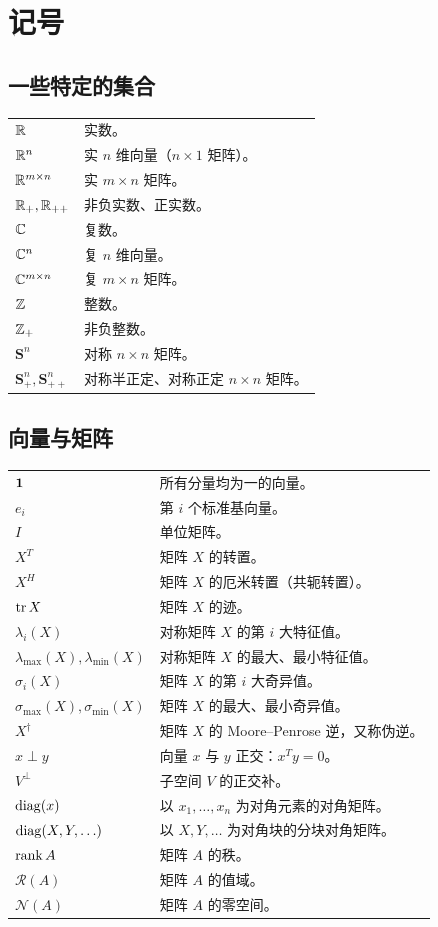 \chapter*{记号}
\section*{一些特定的集合}
\begin{longtable}{@{}p{}p{}@{}}
$\mathbb R$ & 实数。\\
$\mathbb R^n$ & 实 $n$ 维向量（$n\times1$ 矩阵）。\\
$\mathbb R^{m\times n}$ & 实 $m\times n$ 矩阵。\\
$\mathbb R_+,\mathbb R_{++}$ & 非负实数、正实数。\\
$\mathbb C$ & 复数。\\
$\mathbb C^n$ & 复 $n$ 维向量。\\
$\mathbb C^{m\times n}$ & 复 $m\times n$ 矩阵。\\
$\mathbb Z$ & 整数。\\
$\mathbb Z_+$ & 非负整数。\\
$\mathbf S^n$ & 对称 $n\times n$ 矩阵。\\
$\mathbf S_+^n,\mathbf S_{++}^n$ & 对称半正定、对称正定 $n\times n$ 矩阵。
\end{longtable}

\section*{向量与矩阵}
\begin{longtable}{@{}p{}p{}@{}}
$\mathbf 1$ & 所有分量均为一的向量。\\
$e_i$ & 第 $i$ 个标准基向量。\\
$I$ & 单位矩阵。\\
$X^T$ & 矩阵 $X$ 的转置。\\
$X^H$ & 矩阵 $X$ 的厄米转置（共轭转置）。\\
$\operatorname{tr} X$ & 矩阵 $X$ 的迹。\\
$\lambda_i(X)$ & 对称矩阵 $X$ 的第 $i$ 大特征值。\\
$\lambda_{\max}(X),\lambda_{\min}(X)$ & 对称矩阵 $X$ 的最大、最小特征值。\\
$\sigma_i(X)$ & 矩阵 $X$ 的第 $i$ 大奇异值。\\
$\sigma_{\max}(X),\sigma_{\min}(X)$ & 矩阵 $X$ 的最大、最小奇异值。\\
$X^\dagger$ & 矩阵 $X$ 的 Moore--Penrose 逆，又称伪逆。\\
$x\perp y$ & 向量 $x$ 与 $y$ 正交：$x^Ty=0$。\\
$V^\perp$ & 子空间 $V$ 的正交补。\\
$\operatorname{diag}(x)$ & 以 $x_1,\ldots,x_n$ 为对角元素的对角矩阵。\\
$\operatorname{diag}(X,Y,\ldots)$ & 以 $X,Y,\ldots$ 为对角块的分块对角矩阵。\\
$\operatorname{rank} A$ & 矩阵 $A$ 的秩。\\
$\mathcal R(A)$ & 矩阵 $A$ 的值域。\\
$\mathcal N(A)$ & 矩阵 $A$ 的零空间。
\end{longtable}

